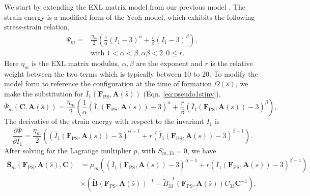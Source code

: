 	We start by extending the EXL matrix model from our previous model \cite{sacks_novel_2016}. The strain energy is a modified form of the Yeoh model, which exhibits the following stress-strain relation,
\begin{equation}
\begin{split}
\Psi_m = &\frac{\eta_m}{2} \left( \frac{1}{\alpha}\left( I_1 -3\right)^{\alpha} + \frac{r}{\beta} \left( I_1 -3\right)^{\beta} \right), \\
&\text{with } 1<\alpha<\beta, \alpha\beta <2, 0 \leq r.
\end{split}
\end{equation}
    Here $\eta_m$ is the EXL matrix modulus, $\alpha,\beta$ are the exponent and $r$ is the relative weight between the two terms which is typically between 10 to 20. To modify the model form to reference the configuration at the time of formation $\Omega(\hat{s})$, we make the substitution for $\bar{I}_1(\mathbf{F}_\mathrm{PS}, \mathbf{A}(\hat{s}))$ (Eqn. \ref{eq:pseudo1stinv}),
\begin{equation} \label{eq:matrixenergyform}
\bar{\Psi}_m\left( \mathbf{C}, \mathbf{A}(\hat{s})\right) = \frac{\eta_m}{2} \left(\frac{1}{\alpha} \left( \bar{I}_1\left(\mathbf{F}_\mathrm{PS}, \mathbf{A}(s)\right) -3\right)^\alpha +\frac{r}{\beta} \left( \bar{I}_1\left(\mathbf{F}_\mathrm{PS}, \mathbf{A}(s)\right) -3\right)^\beta \right),
\end{equation}
    The derivative of the strain energy with respect to the invariant $\bar{I}_1$ is 
\begin{equation}
\frac{\partial \bar{\Psi}}{\partial \bar{I}_1} =	\frac{\eta_m}{2} \left(\left( \bar{I}_1\left(\mathbf{F}_\mathrm{PS}, \mathbf{A}(s)\right)- 3\right)^{\alpha - 1} + r \left( \bar{I}_1\left(\mathbf{F}_\mathrm{PS}, \mathbf{A}(s)\right) - 3\right)^{\beta - 1}\right).
\end{equation}
    After solving for the Lagrange multiplier $p$, with $\bar{S}_{m,33} = 0$, we have 
\begin{equation}\label{eq:matrixfinal}
\begin{split}
\mathbf{\bar{S}}_m \left( \mathbf{F}_\mathrm{PS},\mathbf{A}(\hat{s}),\mathbf{C}\right) &= \mu_m \left(\left( \bar{I}_1\left(\mathbf{F}_\mathrm{PS}, \mathbf{A}(s)\right) - 3\right)^{\alpha - 1} + r \left( \bar{I}_1\left(\mathbf{F}_\mathrm{PS}, \mathbf{A}(s)\right) - 3\right)^{\beta - 1}\right) \\
&\times \left( \mathbf{\tilde{B}}(\mathbf{F}_\mathrm{PS}, \mathbf{A}(\hat{s}))^{-1} - \tilde{B}_{33}^{-1}(\mathbf{F}_\mathrm{PS}, \mathbf{A}(\hat{s}))C_{33}\mathbf{C}^{-1}\right).
\end{split}
\end{equation}


